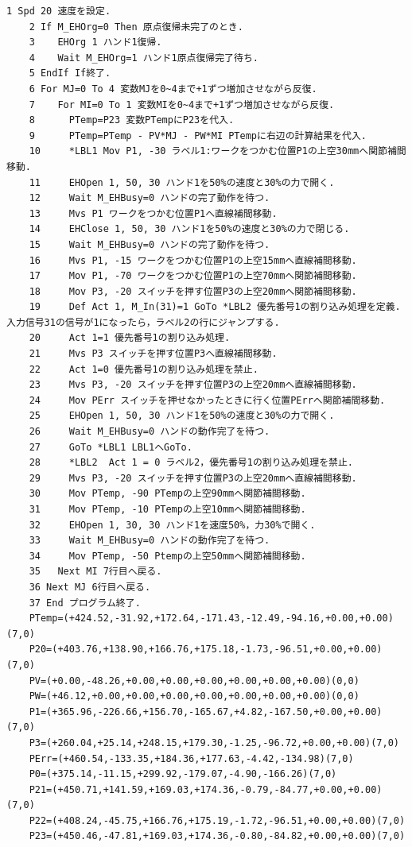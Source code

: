 \documentclass[10pt,a4j]{jsarticle}
\begin{document}
  \begin{lstlisting}[caption=パターン4のソースコード, label=p4_txt]
    1 Spd 20 速度を設定.
    2 If M_EHOrg=0 Then 原点復帰未完了のとき.
    3    EHOrg 1 ハンド1復帰.
    4    Wait M_EHOrg=1 ハンド1原点復帰完了待ち.
    5 EndIf If終了.
    6 For MJ=0 To 4 変数MJを0~4まで+1ずつ増加させながら反復.
    7    For MI=0 To 1 変数MIを0~4まで+1ずつ増加させながら反復.
    8      PTemp=P23 変数PTempにP23を代入.
    9      PTemp=PTemp - PV*MJ - PW*MI PTempに右辺の計算結果を代入.
    10     *LBL1 Mov P1, -30 ラベル1:ワークをつかむ位置P1の上空30mmへ関節補間移動.
    11     EHOpen 1, 50, 30 ハンド1を50%の速度と30%の力で開く.
    12     Wait M_EHBusy=0 ハンドの完了動作を待つ.
    13     Mvs P1 ワークをつかむ位置P1へ直線補間移動.
    14     EHClose 1, 50, 30 ハンド1を50%の速度と30%の力で閉じる.
    15     Wait M_EHBusy=0 ハンドの完了動作を待つ.
    16     Mvs P1, -15 ワークをつかむ位置P1の上空15mmへ直線補間移動.
    17     Mov P1, -70 ワークをつかむ位置P1の上空70mmへ関節補間移動.
    18     Mov P3, -20 スイッチを押す位置P3の上空20mmへ関節補間移動.
    19     Def Act 1, M_In(31)=1 GoTo *LBL2 優先番号1の割り込み処理を定義.入力信号31の信号が1になったら，ラベル2の行にジャンプする.
    20     Act 1=1 優先番号1の割り込み処理.
    21     Mvs P3 スイッチを押す位置P3へ直線補間移動.
    22     Act 1=0 優先番号1の割り込み処理を禁止.
    23     Mvs P3, -20 スイッチを押す位置P3の上空20mmへ直線補間移動.
    24     Mov PErr スイッチを押せなかったときに行く位置PErrへ関節補間移動.
    25     EHOpen 1, 50, 30 ハンド1を50%の速度と30%の力で開く.
    26     Wait M_EHBusy=0 ハンドの動作完了を待つ.
    27     GoTo *LBL1 LBL1へGoTo.
    28     *LBL2  Act 1 = 0 ラベル2，優先番号1の割り込み処理を禁止.
    29     Mvs P3, -20 スイッチを押す位置P3の上空20mmへ直線補間移動.
    30     Mov PTemp, -90 PTempの上空90mmへ関節補間移動.
    31     Mov PTemp, -10 PTempの上空10mmへ関節補間移動.
    32     EHOpen 1, 30, 30 ハンド1を速度50%，力30%で開く.
    33     Wait M_EHBusy=0 ハンドの動作完了を待つ.
    34     Mov PTemp, -50 Ptempの上空50mmへ関節補間移動.
    35   Next MI 7行目へ戻る.
    36 Next MJ 6行目へ戻る.
    37 End プログラム終了.
    PTemp=(+424.52,-31.92,+172.64,-171.43,-12.49,-94.16,+0.00,+0.00)(7,0)
    P20=(+403.76,+138.90,+166.76,+175.18,-1.73,-96.51,+0.00,+0.00)(7,0)
    PV=(+0.00,-48.26,+0.00,+0.00,+0.00,+0.00,+0.00,+0.00)(0,0)
    PW=(+46.12,+0.00,+0.00,+0.00,+0.00,+0.00,+0.00,+0.00)(0,0)
    P1=(+365.96,-226.66,+156.70,-165.67,+4.82,-167.50,+0.00,+0.00)(7,0)
    P3=(+260.04,+25.14,+248.15,+179.30,-1.25,-96.72,+0.00,+0.00)(7,0)
    PErr=(+460.54,-133.35,+184.36,+177.63,-4.42,-134.98)(7,0)
    P0=(+375.14,-11.15,+299.92,-179.07,-4.90,-166.26)(7,0)
    P21=(+450.71,+141.59,+169.03,+174.36,-0.79,-84.77,+0.00,+0.00)(7,0)
    P22=(+408.24,-45.75,+166.76,+175.19,-1.72,-96.51,+0.00,+0.00)(7,0)
    P23=(+450.46,-47.81,+169.03,+174.36,-0.80,-84.82,+0.00,+0.00)(7,0)
  \end{lstlisting}
\end{document}
